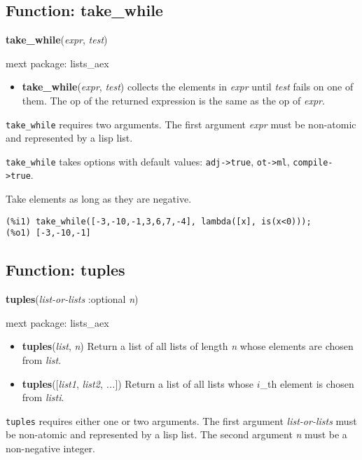 \documentclass[]{article}
\begin{document}
\subsection{Function: take\_while\label{sec:take_while}}
\hypertarget{take_while}{}
{\bf take\_while}({\it expr}, {\it test})


\noindent mext package: lists\_aex



\vspace{5 pt}
\begin{itemize}
\item[] {\bf take\_while}({\it expr}, {\it test})
  collects the elements in {\it expr} until {\it test} fails on one of them. The op of the returned expression is the same as the op of {\it expr}. 

\end{itemize}
   {\tt take\_while} requires two arguments.
    The first argument {\it expr} must be non-atomic and represented by a lisp list.


\vspace{5 pt}

{\tt take\_while} takes options with default values: {\tt adj->true}, {\tt ot->ml}, {\tt compile->true}.
\vspace{5 pt}


   Take elements as long as they are negative. 

\begin{Verbatim}[frame=single]
(%i1) take_while([-3,-10,-1,3,6,7,-4], lambda([x], is(x<0)));
(%o1) [-3,-10,-1]
\end{Verbatim}


\subsection{Function: tuples\label{sec:tuples}}
\hypertarget{tuples}{}
{\bf tuples}({\it list-or-lists} :optional {\it n})


\noindent mext package: lists\_aex



\vspace{5 pt}
\begin{itemize}
\item[] {\bf tuples}({\it list}, {\it n})
  Return a list of all lists of length {\it n} whose elements are chosen from {\it list}. 

\item[] {\bf tuples}([{\it list1}, {\it list2}, {\it ...}])
  Return a list of all lists whose $i$\_th element is chosen from {\it listi}. 

\end{itemize}
   {\tt tuples} requires either one or two arguments.
    The first argument {\it list-or-lists} must be non-atomic and represented by a lisp list.
    The second argument {\it n} must be a non-negative integer.
\end{document}
